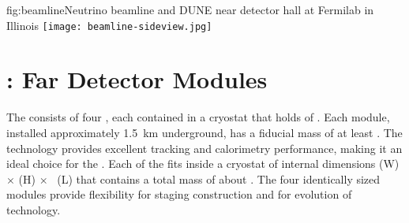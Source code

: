 \begin{dunefigure}{fig:beamline}{Neutrino beamline and DUNE near detector hall at Fermilab in Illinois}
\texttt{[image: beamline-sideview.jpg]}
\end{dunefigure}

\section{: Far Detector Modules}
\label{sec:physics-intro-dunefd}

The %
{}  consists of four  , each contained in a cryostat that holds \larmass of . Each module, installed approximately \SI{1.5}{km} underground, has a fiducial mass of at least \nominalmodsize. The  technology provides
excellent tracking and calorimetry performance, making it an ideal
choice for the  . Each of the  fits inside a cryostat of internal dimensions
\cryostatwdth (W) $\times$ \cryostatht (H) $\times$ \cryostatlen~(L) that contains a total  mass of about \larmass{}.
 The four identically sized modules provide flexibility for staging construction and for evolution of  technology.

